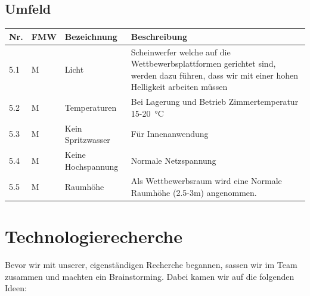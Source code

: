 \documentclass[a4paper]{report}
\begin{document}
\section{Umfeld}
\label{app:sec:Umfeld}
\begin{tabular}{|p{}|p{}|p{}|p{}|}
	\hline
	\textbf{Nr.} & \textbf{FMW\footnotemark} & \textbf{Bezeichnung} & \textbf{Beschreibung} \\
	\hline
	5.1 & M & Licht & Scheinwerfer welche auf die Wettbewerbsplattformen gerichtet sind, werden dazu führen, dass wir mit einer hohen Helligkeit arbeiten müssen \\
	\hline
	5.2 & M & Temperaturen & Bei Lagerung und Betrieb Zimmertemperatur 15-\SI{20}{\degreeCelsius}\\
	\hline
	5.3 & M & Kein Spritzwasser & Für Innenanwendung\\
	\hline
	5.4 & M & Keine Hochspannung & Normale Netzspannung\\
	\hline
	5.5 & M & Raumhöhe & Als Wettbewerbsraum wird eine Normale Raumhöhe (2.5-3m) angenommen.\\
	\hline
\end{tabular}

\chapter{Technologierecherche}
\label{app:ch:TechRech}
Bevor wir mit unserer, eigenständigen Recherche begannen, sassen wir im Team zusammen und machten ein Brainstorming. Dabei kamen wir auf die folgenden Ideen:
\end{document}
